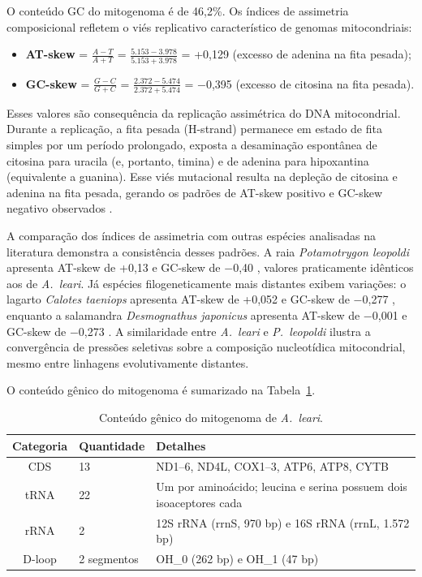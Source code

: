 O conteúdo GC do mitogenoma é de 46,2\%. Os índices de assimetria composicional refletem o viés replicativo característico de genomas mitocondriais:

\begin{itemize}
    \item \textbf{AT-skew} = $\frac{A - T}{A + T}$ = $\frac{5.153 - 3.978}{5.153 + 3.978}$ = +0,129 (excesso de adenina na fita pesada);
    \item \textbf{GC-skew} = $\frac{G - C}{G + C}$ = $\frac{2.372 - 5.474}{2.372 + 5.474}$ = $-$0,395 (excesso de citosina na fita pesada).
\end{itemize}

Esses valores são consequência da replicação assimétrica do DNA mitocondrial. Durante a replicação, a fita pesada (H-strand) permanece em estado de fita simples por um período prolongado, exposta a desaminação espontânea de citosina para uracila (e, portanto, timina) e de adenina para hipoxantina (equivalente a guanina). Esse viés mutacional resulta na depleção de citosina e adenina na fita pesada, gerando os padrões de AT-skew positivo e GC-skew negativo observados \cite{boore1999}.

A comparação dos índices de assimetria com outras espécies analisadas na literatura demonstra a consistência desses padrões. A raia \textit{Potamotrygon leopoldi} apresenta AT-skew de +0,13 e GC-skew de $-$0,40 \cite{guerreiro2025}, valores praticamente idênticos aos de \textit{A.~leari}. Já espécies filogeneticamente mais distantes exibem variações: o lagarto \textit{Calotes taeniops} apresenta AT-skew de +0,052 e GC-skew de $-$0,277 \cite{kundu2024}, enquanto a salamandra \textit{Desmognathus japonicus} apresenta AT-skew de $-$0,001 e GC-skew de $-$0,273 \cite{hong2024}. A similaridade entre \textit{A.~leari} e \textit{P.~leopoldi} ilustra a convergência de pressões seletivas sobre a composição nucleotídica mitocondrial, mesmo entre linhagens evolutivamente distantes.

O conteúdo gênico do mitogenoma é sumarizado na Tabela~\ref{tab:conteudo_genico}.

\begin{table}[H]
\centering
\caption{Conteúdo gênico do mitogenoma de \textit{A.~leari}.}
\label{tab:conteudo_genico}
\begin{tabular}{@{}clp{8cm}@{}}
\toprule
\textbf{Categoria} & \textbf{Quantidade} & \textbf{Detalhes} \\
\midrule
CDS & 13 & ND1--6, ND4L, COX1--3, ATP6, ATP8, CYTB \\
\addlinespace
tRNA & 22 & Um por aminoácido; leucina e serina possuem dois isoaceptores cada \\
\addlinespace
rRNA & 2 & 12S rRNA (rrnS, 970 bp) e 16S rRNA (rrnL, 1.572 bp) \\
\addlinespace
D-loop & 2 segmentos & OH\_0 (262 bp) e OH\_1 (47 bp) \\
\bottomrule
\end{tabular}
\end{table}

